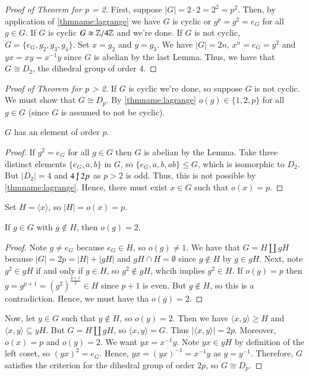 \begin{proof}[Proof of Theorem for p = 2]
        First, suppose $|G| = 2\cdot 2 = 2^2 = p^2$. Then, by application of \ref{thmname:lagrange} we have $G$ is cyclic or $g^p = g^2 = e_G$ for all $g \in G$. If $G$ is cyclic $G \cong \mathbb Z/4\mathbb Z$ and we're done. If $G$ is not cyclic, $G = \{e_G,g_2,g_3,g_4\}$. Set $x = g_2$ and $y = g_3$. We have $|G| = 2n$, $x^n = e_G = y^2$ and $yx= xy = x^{-1}y$ since $G$ is abelian by the last Lemma. Thus, we have that $G \cong D_2$, the dihedral group of order $4$.
\end{proof}

\begin{proof}[Proof of Theorem for p > 2]
        If $G$ is cyclic we're done, so suppose $G$ is not cyclic. We must show that $G \cong D_p$. By \ref{thmname:lagrange} $o(g) \in \{1,2,p\}$ for all $g \in G$ (since $G$ is assumed to not be cyclic). 

        \begin{claim}
                $G$ has an element of order $p$.
        \end{claim}
        \begin{proof}
                If $g^2 = e_G$ for all $g \in G$ then $G$ is abelian by the Lemma. Take three distinct elements $\{e_G, a, b\}$ in $G$, so $\{e_G,a,b,ab\} \leq G$, which is isomorphic to $D_2$. But $|D_2| = 4$ and $4 \;\cancel{\vert}\;2p$ as $p > 2$ is odd. Thus, this is not possible by \ref{thmname:lagrange}. Hence, there must exist $x \in G$ such that $o(x) = p$.
        \end{proof}
        Set $H = \langle x \rangle$, so $|H| = o(x) = p$.
        
        \begin{claim}
                If $g \in G$ with $g \notin H$, then $o(g) = 2$.
        \end{claim}
        \begin{proof}
                Note $g \neq e_G$ because $e_G \in H$, so $o(g) \neq 1$. We have that $G = H\coprod gH$ because $|G| = 2p = |H| + |gH|$ and $gH \cap H =\emptyset$ since $g \notin H$ by $g \in gH$. Next, note $g^2 \in gH$ if and only if $g \in H$, so $g^2 \notin gH$, whcih implies $g^2 \in H$. If $o(g) = p$ then $g = g^{p+1} = (g^2)^{\frac{p+1}{2}} \in H$ since $p+1$ is even. But $g \notin H$, so this is a contradiction. Hence, we must have tha $o(g) = 2$.
        \end{proof}

        Now, let $y \in G$ such that $y \notin H$, so $o(y) = 2$. Then we have $\langle x,y\rangle \geq H$ and $\langle x, y \rangle \subseteq yH$. But $G = H\coprod gH$, so $\langle x,y \rangle = G$. Thus $|\langle x,y \rangle| = 2p$. Moreover, $o(x) = p$ and $o(y) = 2$. We want $yx = x^{-1}y$. Note $yx \in yH$ by definition of the left coset, so $(yx)^2 = e_G$. Hence, $yx = (yx)^{-1} = x^{-1}y$ as $y = y^{-1}$. Therefore, $G$ satisfies the criterion for the dihedral group of order $2p$, so $G \cong D_p$.
\end{proof}



